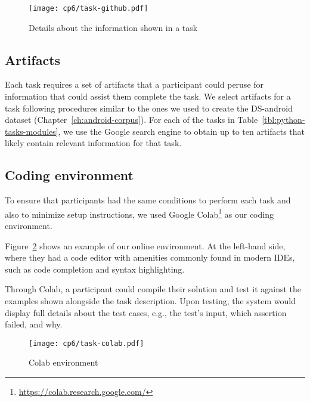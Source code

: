 \clearpage

\begin{figure}
    \centering
    \texttt{[image: cp6/task-github.pdf]}
    \caption{Details about the information shown in a task}
    \label{fig:nytimes-task-colab}
\end{figure}

\clearpage









\subsection{Artifacts}
\label{cp6:experiment-artifacts}


Each task requires a set of artifacts that a participant could peruse for information that could assist them complete the task.
We select artifacts for a task following procedures similar to the ones we used to create the \acs{DS-android} dataset (Chapter~\ref{ch:android-corpus}). 
For each of the tasks in Table~\ref{tbl:python-tasks-modules}, we use the Google search engine to obtain up to ten artifacts that likely contain relevant
information for that task. 









\subsection{Coding environment}
\label{cp6:coding-environment}






To ensure that participants had the same conditions to perform each task
and also to minimize setup instructions, we used Google Colab\footnote{\url{https://colab.research.google.com/}} as our coding environment. 



Figure~\ref{fig:nytimes-task-colab} shows an example of our online environment.
At the left-hand side, 
where they had a code editor with amenities commonly found in modern IDEs, such as code completion and syntax highlighting. 



Through Colab, a participant could compile their solution and test it against the examples shown alongside the task description.
Upon testing, the system would display full details about the test cases, e.g., the test's input, which assertion failed, and why. 




\clearpage

\begin{figure}
    \centering
    \texttt{[image: cp6/task-colab.pdf]}
    \caption{Colab environment}
    \label{fig:nytimes-task-colab}
\end{figure}



\clearpage